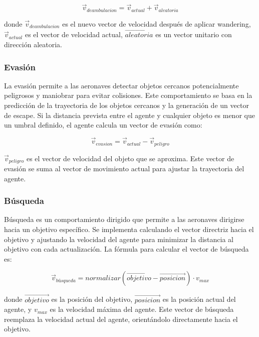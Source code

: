 \begin{equation}
\label{eq10}
    \vec{v}_{deambulacion} = \vec{v}_{actual} + \vec{v}_{aleatoria}
\end{equation}

donde \(\vec{v}_{deambulacion}\) es el nuevo vector de velocidad después de aplicar wandering, \(\vec{v}_{actual}\) es el vector de velocidad actual, \(\vec{aleatoria}\) es un vector unitario con dirección aleatoria.

\subsubsection{Evasión}
La evasión permite a las aeronaves detectar objetos cercanos potencialmente peligrosos y maniobrar para evitar colisiones. Este comportamiento se basa en la predicción de la trayectoria de los objetos cercanos y la generación de un vector de escape. Si la distancia prevista entre el agente y cualquier objeto es menor que un umbral definido, el agente calcula un vector de evasión como:

\begin{equation}
\label{eq11}
    \vec{v}_{evasion} = \vec{v}_{actual} - \vec{v}_{peligro}
\end{equation}

\(\vec{v}_{peligro}\) es el vector de velocidad del objeto que se aproxima. Este vector de evasión se suma al vector de movimiento actual para ajustar la trayectoria del agente.

\subsubsection{Búsqueda}
Búsqueda es un comportamiento dirigido que permite a las aeronaves dirigirse hacia un objetivo específico. Se implementa calculando el vector directriz hacia el objetivo y ajustando la velocidad del agente para minimizar la distancia al objetivo con cada actualización. La fórmula para calcular el vector de búsqueda es:

\begin{equation}
\label{eq12}
    \vec{v}_{búsqueda} = {normalizar}(\vec{objetivo} - \vec{posicion}) \cdot v_{max}
\end{equation}

donde \(\vec{objetivo}\) es la posición del objetivo, \(\vec{posicion}\) es la posición actual del agente, y \(v_{max}\) es la velocidad máxima del agente. Este vector de búsqueda reemplaza la velocidad actual del agente, orientándolo directamente hacia el objetivo.

